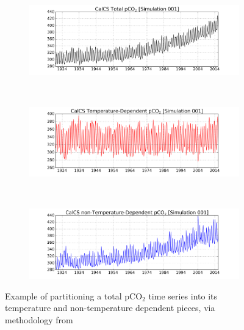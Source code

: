 \documentclass[12pt]{article}
\begin{document}
\clearpage
\begin{figure}[!h]
	\centering
	\begin{subfigure}[b]{\textwidth}
		\centering
		\includegraphics[width=\linewidth]{../../figs/calcs/timeseries/calcs-total-pco2-001.png}
	\end{subfigure} \\
	\begin{subfigure}[b]{\textwidth}
		\centering
		\includegraphics[width=\linewidth]{../../figs/calcs/timeseries/calcs-pCO2_T-pco2-001.png}
	\end{subfigure} \\
	\begin{subfigure}[b]{\textwidth}
		\centering
		\includegraphics[width=\linewidth]{../../figs/calcs/timeseries/calcs-pCO2_nonT-pco2-001.png}
	\end{subfigure} 
	\caption{Example of partitioning a total pCO$_{2}$ time series into its temperature and non-temperature dependent pieces, via methodology from \citet{Takahashi2002}}
	\label{fig:pco2-decomposition}
\end{figure}
\end{document}
